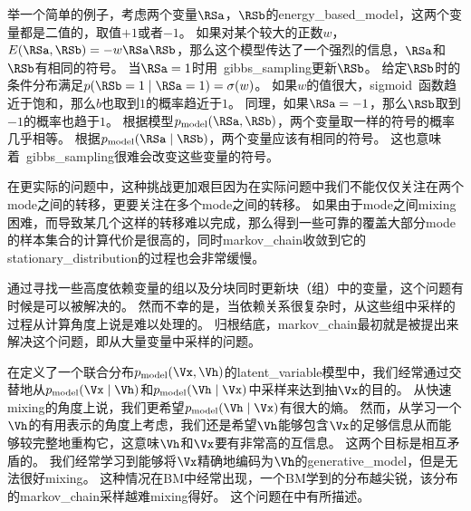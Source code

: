 举一个简单的例子，考虑两个变量$\RSa$，$\RSb$的\gls{energy_based_model}，这两个变量都是二值的，取值$+1$或者$-1$。   %
如果对某个较大的正数$w$，$E(\RSa,\RSb) = - w \RSa \RSb$，那么这个模型传达了一个强烈的信息，$\RSa$和$\RSb$有相同的符号。
当$\RSa=1$时用~\gls{gibbs_sampling}更新$\RSb$。
给定$\RSb$时的条件分布满足$p(\RSb=1\mid \RSa=1) = \sigma(w)$。
如果$w$的值很大，\gls{sigmoid}~函数趋近于饱和，那么$b$也取到$1$的概率趋近于$1$。
同理，如果$\RSa=-1$，那么$\RSb$取到$-1$的概率也趋于$1$。 
根据模型$p_{\text{model}}(\RSa,\RSb)$，两个变量取一样的符号的概率几乎相等。
根据$p_{\text{model}}(\RSa\mid \RSb)$，两个变量应该有相同的符号。
这也意味着~\gls{gibbs_sampling}很难会改变这些变量的符号。

在更实际的问题中，这种挑战更加艰巨因为在实际问题中我们不能仅仅关注在两个\gls{mode}之间的转移，更要关注在多个\gls{mode}之间的转移。 
如果由于\gls{mode}之间\gls{mixing}困难，而导致某几个这样的转移难以完成，那么得到一些可靠的覆盖大部分\gls{mode}的样本集合的计算代价是很高的，同时\gls{markov_chain}收敛到它的\gls{stationary_distribution}的过程也会非常缓慢。

通过寻找一些高度依赖变量的组以及分块同时更新块（组）中的变量，这个问题有时候是可以被解决的。
然而不幸的是，当依赖关系很复杂时，从这些组中采样的过程从计算角度上说是难以处理的。
归根结底，\gls{markov_chain}最初就是被提出来解决这个问题，即从大量变量中采样的问题。


在定义了一个联合分布$p_{\text{model}}(\Vx,\Vh)$的\gls{latent_variable}模型中，我们经常通过交替地从$p_{\text{model}}(\Vx\mid \Vh)$和$p_{\text{model}}(\Vh\mid \Vx)$中采样来达到抽$\Vx$的目的。  
从快速\gls{mixing}的角度上说，我们更希望$p_{\text{model}}(\Vh\mid \Vx)$有很大的熵。
然而，从学习一个$\Vh$的有用表示的角度上考虑，我们还是希望$\Vh$能够包含$\Vx$的足够信息从而能够较完整地重构它，这意味$\Vh$和$\Vx$要有非常高的互信息。
这两个目标是相互矛盾的。
我们经常学习到能够将$\Vx$精确地编码为$\Vh$的\gls{generative_model}，但是无法很好\gls{mixing}。
这种情况在\gls{BM}中经常出现，一个\gls{BM}学到的分布越尖锐，该分布的\gls{markov_chain}采样越难\gls{mixing}得好。
这个问题在中有所描述。


